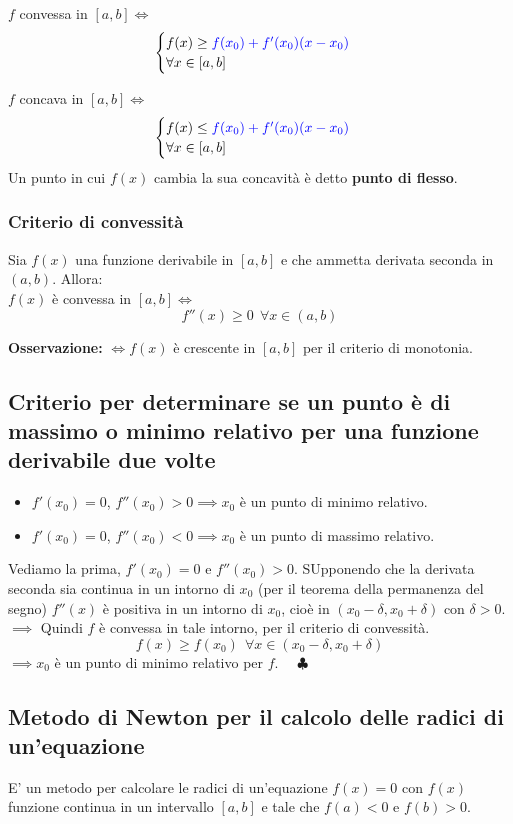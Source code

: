 \documentclass[../../main.tex]{subfiles}
\begin{document}
$f$ convessa in $[a, b] \iff$
\[
    \begin{cases}
        f(x)\geq \textcolor{blue}{f(x_0) + f'(x_0)(x-x_0)} \\
        \forall x\in[a, b]
    \end{cases}
\]

$f$ concava in $[a, b] \iff$
\[
    \begin{cases}
        f(x)\leq \textcolor{blue}{f(x_0) + f'(x_0)(x-x_0)} \\
        \forall x\in[a, b]
    \end{cases}
\]
Un punto in cui $f(x)$ cambia la sua concavità è detto \textbf{punto di flesso}.

\subsubsection{Criterio di convessità}
Sia $f(x)$ una funzione derivabile in $[a, b]$ e che ammetta derivata seconda in $(a, b)$. Allora:\\
$f(x)$ è convessa in $[a, b] \iff$
\[
    f''(x) \geq 0 \ \ \forall x\in(a, b)
\]

\textbf{Osservazione:} $\iff f(x)$ è crescente in $[a, b]$ per il criterio di monotonia.

\subsection{Criterio per determinare se un punto è di massimo o minimo relativo per una funzione derivabile due volte} %
\begin{itemize}
    \item $f'(x_0) = 0$, $f''(x_0) > 0 \implies x_0$ è un punto di minimo relativo.
    \item $f'(x_0) = 0$, $f''(x_0) < 0 \implies x_0$ è un punto di massimo relativo.
\end{itemize}
Vediamo la prima, $f'(x_0) = 0$ e $f''(x_0) > 0$. SUpponendo che la derivata seconda sia continua in un intorno di $x_0$
(per il teorema della permanenza del segno) $f''(x)$ è positiva in un intorno di $x_0$, cioè in
$(x_0 - \delta, x_0 + \delta)$ con $\delta > 0$.\\
$\implies$ Quindi $f$ è convessa in tale intorno, per il criterio di convessità.
\[
    f(x)\geq f(x_0) \ \ \forall x\in(x_0 - \delta, x_0 + \delta)
\]
$\implies x_0$ è un punto di minimo relativo per $f$. \ \ $\clubsuit$

\subsection{Metodo di Newton per il calcolo delle radici di un'equazione}
E' un metodo per calcolare le radici di un'equazione $f(x) = 0$ con $f(x)$ funzione continua in un intervallo $[a, b]$ e tale che
$f(a) < 0$ e $f(b) > 0$.\\
\end{document}
